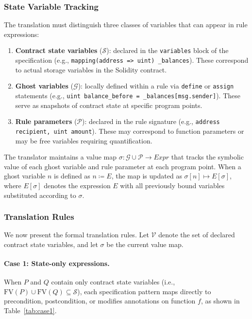 \subsubsection{State Variable Tracking}
\label{sec:state-tracking}

The translation must distinguish three classes of variables that can appear in rule expressions:

\begin{enumerate}
    \item \textbf{Contract state variables} ($\mathcal{S}$): declared in the \texttt{variables} block of the specification (e.g., \texttt{mapping(address => uint) \_balances}). These correspond to actual storage variables in the Solidity contract.
    
    \item \textbf{Ghost variables} ($\mathcal{G}$): locally defined within a rule via \texttt{define} or \texttt{assign} statements (e.g., \texttt{uint balance\_before = \_balances[msg.sender]}). These serve as snapshots of contract state at specific program points.
    
    \item \textbf{Rule parameters} ($\mathcal{P}$): declared in the rule signature (e.g., \texttt{address recipient, uint amount}). These may correspond to function parameters or may be free variables requiring quantification.
\end{enumerate}

The translator maintains a value map $\sigma: \mathcal{G} \cup \mathcal{P} \to \textit{Expr}$ that tracks the symbolic value of each ghost variable and rule parameter at each program point. When a ghost variable $n$ is defined as $n \coloneqq E$, the map is updated as $\sigma[n] \mapsto E[\sigma]$, where $E[\sigma]$ denotes the expression $E$ with all previously bound variables substituted according to $\sigma$.

\subsubsection{Translation Rules}
\label{sec:translation-rules}

We now present the formal translation rules. Let $\mathcal{V}$ denote the set of declared contract state variables, and let $\sigma$ be the current value map.

\paragraph{Case 1: State-only expressions.}
When $P$ and $Q$ contain only contract state variables (i.e., $\text{FV}(P) \cup \text{FV}(Q) \subseteq \mathcal{S}$), each specification pattern maps directly to precondition, postcondition, or modifies annotations on function $f$, as shown in Table~\ref{tab:case1}.

